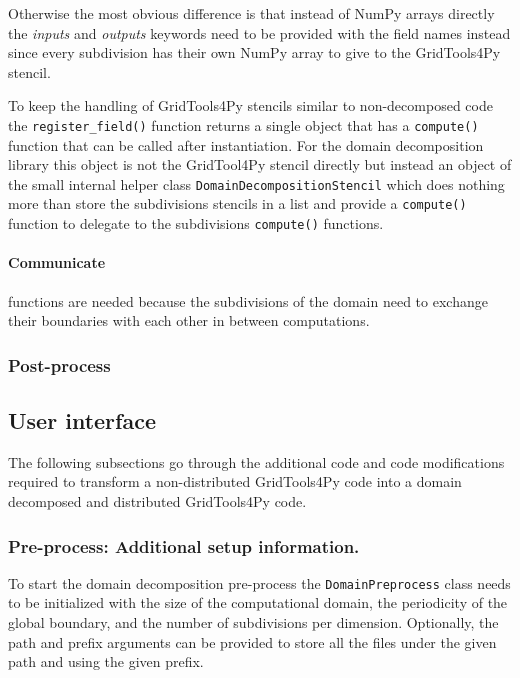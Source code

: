 Otherwise the most obvious difference is that instead of NumPy arrays directly the \textit{inputs} and \textit{outputs} keywords need to be provided with the field names instead since every subdivision has their own NumPy array to give to the GridTools4Py stencil.

To keep the handling of GridTools4Py stencils similar to non-decomposed code the \texttt{register\_field()} function returns a single object that has a \texttt{compute()} function that can be called after instantiation.
For the domain decomposition library this object is not the GridTool4Py stencil directly but instead an object of the small internal helper class \texttt{DomainDecompositionStencil} which does nothing more than store the subdivisions stencils in a list and provide a \texttt{compute()} function to delegate to the subdivisions \texttt{compute()} functions.

\paragraph{Communicate } functions are needed because the subdivisions of the domain need to exchange their boundaries with each other in between computations.

\subsubsection{Post-process}

\newpage
\subsection{User interface}
The following subsections go through the additional code and code modifications required to transform a non-distributed GridTools4Py code into a domain decomposed and distributed GridTools4Py code.

\subsubsection{Pre-process: Additional setup information.}
\label{sec:userpreprocess}
To start the domain decomposition pre-process the \texttt{DomainPreprocess} class needs to be initialized with the size of the computational domain, the periodicity of the global boundary, and the number of subdivisions per dimension.
Optionally, the path and prefix arguments can be provided to store all the files under the given path and using the given prefix.

